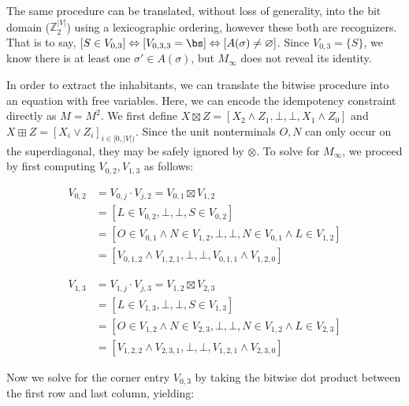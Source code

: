 \documentclass[runningheads]{llncs}
\begin{document}
The same procedure can be translated, without loss of generality, into the bit domain ($\mathbb{Z}_2^{|V|}$) using a lexicographic ordering, however these both are recognizers. That is to say, $[S\in V_{0, 3}]\Leftrightarrow [V_{0, 3, 3}=\bs] \Leftrightarrow [A(\sigma) \neq \varnothing]$. Since $V_{0, 3} = \{S\}$, we know there is at least one $\sigma' \in A(\sigma)$, but $M_\infty$ does not reveal its identity.


In order to extract the inhabitants, we can translate the bitwise procedure into an equation with free variables. Here, we can encode the idempotency constraint directly as $M = M^2$. We first define $X \boxtimes Z = [X_2 \land Z_1, \bot, \bot, X_1 \land Z_0]$ and $X \boxplus Z = [X_i \lor Z_i]_{i \in [0, |V|)}$. Since the unit nonterminals $O, N$ can only occur on the superdiagonal, they may be safely ignored by $\otimes$. To solve for $M_\infty$, we proceed by first computing $V_{0, 2}, V_{1, 3}$ as follows:

\begin{align}
V_{0, 2} &= V_{0, j} \cdot V_{j, 2} = V_{0, 1} \boxtimes V_{1, 2}\\
         &= [L \in V_{0, 2}, \bot, \bot, S \in V_{0, 2}]\\
         &= [O \in V_{0, 1} \land N \in V_{1, 2}, \bot, \bot, N \in V_{0, 1} \land L \in V_{1, 2}]\\
         &= [V_{0, 1, 2} \land V_{1, 2, 1}, \bot, \bot, V_{0, 1, 1} \land V_{1, 2, 0}]
\end{align}

\begin{align}
  V_{1, 3} &= V_{1, j} \cdot V_{j, 3} = V_{1, 2} \boxtimes V_{2, 3}\\
  &= [L \in V_{1, 3}, \bot, \bot, S \in V_{1, 3}]\\
  &= [O \in V_{1, 2} \land N \in V_{2, 3}, \bot, \bot, N \in V_{1, 2} \land L \in V_{2, 3}]\\
  &= [V_{1, 2, 2} \land V_{2, 3, 1}, \bot, \bot, V_{1, 2, 1} \land V_{2, 3, 0}]
\end{align}

Now we solve for the corner entry $V_{0, 3}$ by taking the bitwise dot product between the first row and last column, yielding:
\end{document}
